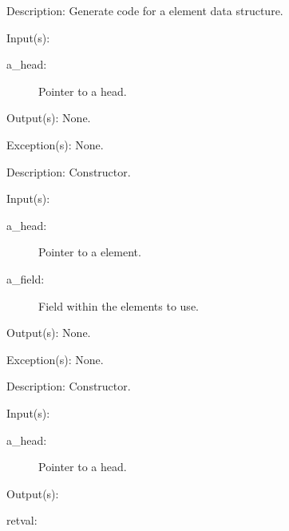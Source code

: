 \begin{capi}
\begin{capilist}
	\item[Description: ]
		Generate code for a  element data structure.
	\end{capilist}
\label{qs_new}
	\begin{capilist}
	\item[Input(s): ]
		\begin{description}\item[]
		\item[a\_head: ]
			Pointer to a  head.
		\end{description}
	\item[Output(s): ] None.
	\item[Exception(s): ] None.
	\item[Description: ]
		Constructor.
	\end{capilist}
\label{qs_elm_new}
	\begin{capilist}
	\item[Input(s): ]
		\begin{description}\item[]
		\item[a\_head: ]
			Pointer to a  element.
		\item[a\_field: ]
			Field within the  elements to use.
		\end{description}
	\item[Output(s): ] None.
	\item[Exception(s): ] None.
	\item[Description: ]
		Constructor.
	\end{capilist}
\label{qs_top}
	\begin{capilist}
	\item[Input(s): ]
		\begin{description}\item[]
		\item[a\_head: ]
			Pointer to a \classname{qs} head.
		\end{description}
	\item[Output(s): ]
		\begin{description}\item[]
		\item[retval: ]

\end{description}
\end{capilist}
\end{capi}
